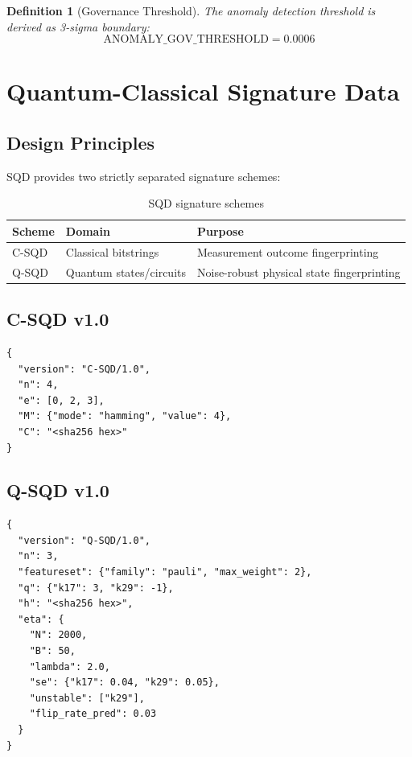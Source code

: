 \documentclass[11pt,a4paper]{article}
\newtheorem{definition}{Definition}
\theoremstyle{plain}
\begin{document}
\begin{definition}[Governance Threshold]
The anomaly detection threshold is derived as 3-sigma boundary:
\begin{equation}
    \text{ANOMALY\_GOV\_THRESHOLD} = 0.0006
\end{equation}
\end{definition}

\section{Quantum-Classical Signature Data}

\subsection{Design Principles}

SQD provides two strictly separated signature schemes:

\begin{table}[h]
\centering
\begin{tabular}{lll}
\toprule
\textbf{Scheme} & \textbf{Domain} & \textbf{Purpose} \\
\midrule
C-SQD & Classical bitstrings & Measurement outcome fingerprinting \\
Q-SQD & Quantum states/circuits & Noise-robust physical state fingerprinting \\
\bottomrule
\end{tabular}
\caption{SQD signature schemes}
\label{tab:sqdSchemes}
\end{table}

\subsection{C-SQD v1.0}

\begin{lstlisting}[caption=C-SQD JSON Schema, label=lst:csqd]
{
  "version": "C-SQD/1.0",
  "n": 4,
  "e": [0, 2, 3],
  "M": {"mode": "hamming", "value": 4},
  "C": "<sha256 hex>"
}
\end{lstlisting}

\subsection{Q-SQD v1.0}

\begin{lstlisting}[caption=Q-SQD JSON Schema, label=lst:qsqd]
{
  "version": "Q-SQD/1.0",
  "n": 3,
  "featureset": {"family": "pauli", "max_weight": 2},
  "q": {"k17": 3, "k29": -1},
  "h": "<sha256 hex>",
  "eta": {
    "N": 2000,
    "B": 50,
    "lambda": 2.0,
    "se": {"k17": 0.04, "k29": 0.05},
    "unstable": ["k29"],
    "flip_rate_pred": 0.03
  }
}
\end{lstlisting}
\end{document}
